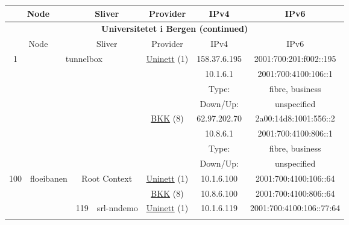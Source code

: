 \begin{small}
\begin{center}
\begin{longtable}{|c|c|c|c|c|c|c|c|}
 \multicolumn{2}{|p{8em}|}{Node} & \multicolumn{2}{|p{8em}|}{Sliver} & \multicolumn{2}{|p{8em}|}{Provider} & IPv4 & IPv6 \\ \hline
\endfirsthead
\hline
 \multicolumn{8}{|c|}{\textbf{Universitetet i Bergen (continued)}} \\ \hline
 \multicolumn{2}{|p{8em}|}{Node} & \multicolumn{2}{|p{8em}|}{Sliver} & \multicolumn{2}{|p{8em}|}{Provider} & IPv4 & IPv6 \\ \hline
\endhead
 \multirow{8}{*}{\tiny{1}} & \multicolumn{3}{|c|}{\multirow{8}{*}{\tiny{tunnelbox}}} & \multicolumn{2}{|c|}{\multirow{4}{*}{\tiny{\href{https://www.uninett.no}{Uninett} (1)}}} & \tiny{158.37.6.195} & \tiny{2001:700:201:f002::195} \\* \cline{7-7}\cline{8-8}
  & \multicolumn{3}{|c|}{} & \multicolumn{2}{|c|}{} & \tiny{10.1.6.1} & \tiny{2001:700:4100:106::1} \\* \cline{7-7}\cline{8-8}
  & \multicolumn{3}{|c|}{} & \multicolumn{2}{|c|}{} & Type: & fibre, business \\* \cline{7-7}\cline{8-8}
  & \multicolumn{3}{|c|}{} & \multicolumn{2}{|c|}{} & Down/Up:  & unspecified \\* \cline{5-5}\cline{6-6}\cline{7-7}\cline{8-8}
  & \multicolumn{3}{|c|}{} & \multicolumn{2}{|c|}{\multirow{4}{*}{\tiny{\href{http://bkk.no}{BKK} (8)}}} & \tiny{62.97.202.70} & \tiny{2a00:14d8:1001:556::2} \\* \cline{7-7}\cline{8-8}
  & \multicolumn{3}{|c|}{} & \multicolumn{2}{|c|}{} & \tiny{10.8.6.1} & \tiny{2001:700:4100:806::1} \\* \cline{7-7}\cline{8-8}
  & \multicolumn{3}{|c|}{} & \multicolumn{2}{|c|}{} & Type: & fibre, business \\* \cline{7-7}\cline{8-8}
  & \multicolumn{3}{|c|}{} & \multicolumn{2}{|c|}{} & Down/Up:  & unspecified \\ \hline
 \multirow{36}{*}{\tiny{100}} & \multicolumn{1}{|l|}{\multirow{36}{*}{\tiny{floeibanen}}} & \multicolumn{2}{|c|}{\multirow{2}{*}{\tiny{Root Context}}} & \multicolumn{2}{|c|}{\tiny{\href{https://www.uninett.no}{Uninett} (1)}} & \tiny{10.1.6.100} & \tiny{2001:700:4100:106::64} \\* \cline{5-5}\cline{6-6}\cline{7-7}\cline{8-8}
  &  & \multicolumn{2}{|c|}{} & \multicolumn{2}{|c|}{\tiny{\href{http://bkk.no}{BKK} (8)}} & \tiny{10.8.6.100} & \tiny{2001:700:4100:806::64} \\* \cline{3-3}\cline{4-4}\cline{5-5}\cline{6-6}\cline{7-7}\cline{8-8}
  &  & \multirow{2}{*}{\tiny{119}} & \multicolumn{1}{|l|}{\multirow{2}{*}{\tiny{srl-nndemo}}} & \multicolumn{2}{|c|}{\tiny{\href{https://www.uninett.no}{Uninett} (1)}} & \tiny{10.1.6.119} & \tiny{2001:700:4100:106::77:64} \\* \cline{5-5}\cline{6-6}\cline{7-7}\cline{8-8}

\end{longtable}
\end{center}
\end{small}
